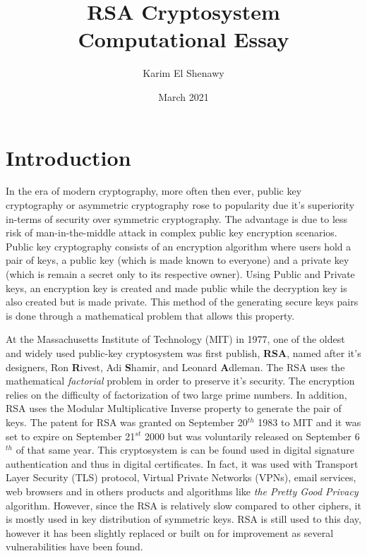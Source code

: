 \documentclass{article}
\title{RSA Cryptosystem\\Computational Essay}
\author{Karim El Shenawy}
\date{March 2021}
\begin{document}
\maketitle
\thispagestyle{empty}
\newpage
{}
\tableofcontents

\newpage

\section{Introduction}

\quad \quad In the era of modern cryptography, more often then ever, public key cryptography or asymmetric cryptography rose to popularity due it's superiority in-terms of security over symmetric cryptography. The advantage is due to less risk of man-in-the-middle attack in complex public key encryption scenarios. Public key cryptography consists of an encryption algorithm where users hold a pair of keys, a public key (which is made known to everyone) and a private key (which is remain a secret only to its respective owner). Using Public and Private keys, an encryption key is created and made public while the decryption key is also created but is made private. This method of the generating secure keys pairs is done through a mathematical problem that allows this property. 

At the Massachusetts Institute of Technology (MIT) in 1977, one of the oldest and widely used public-key cryptosystem was first publish, \textbf{RSA}, named after it's designers, Ron \textbf{R}ivest, Adi \textbf{S}hamir, and Leonard \textbf{A}dleman. The RSA uses the mathematical \textit{factorial} problem in order to preserve it's security. The encryption relies on the difficulty of factorization of two large prime numbers. In addition, RSA uses the Modular Multiplicative Inverse property to generate the pair of keys. The patent for RSA was granted on September 20$^{th}$ 1983 to MIT and it was set to expire on September 21$^{st}$ 2000 but was voluntarily released on September 6$^{th}$ of that same year. This cryptosystem is can be found used in digital signature authentication and thus in digital certificates. In fact, it was used with Transport Layer Security (TLS) protocol, Virtual Private Networks (VPNs), email services, web browsers and in others products and algorithms like \textit{the Pretty Good Privacy} algorithm. However, since the RSA is relatively slow compared to other ciphers, it is mostly used in key distribution of symmetric keys. RSA is still used to this day, however it has been slightly replaced or built on for improvement as several vulnerabilities have been found.
\end{document}
